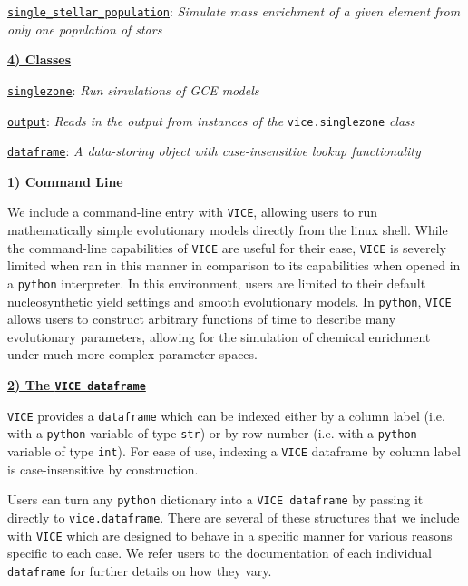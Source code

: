 \documentclass{report}
\begin{document}
\hyperlink{func:single_stellar_population}{\texttt{single\_stellar\_population}}: 
\textit{Simulate mass enrichment of a given element from only one population 
of stars}
\par\noindent
\hyperlink{sec:classes}{\textbf{4) Classes}} 
\par
\hyperlink{obj:singlezone}{\texttt{singlezone}}: 
\textit{Run simulations of GCE models}\par
\hyperlink{obj:output}{\texttt{output}}: 
\textit{Reads in the output from instances of the }\texttt{vice.singlezone}
\textit{ class}
\par
\hyperlink{obg:dataframe}{\texttt{dataframe}}: 
\textit{A data-storing object with case-insensitive lookup functionality}
\par\null\par

\noindent
\hypertarget{sec:cmdline}{\textbf{1) Command Line}} \par\noindent 
We include a command-line entry with \texttt{VICE}, allowing users to run 
mathematically simple evolutionary models directly from the linux shell. While 
the command-line capabilities of \texttt{VICE} are useful for their ease, 
\texttt{VICE} is severely limited when ran in this manner in comparison to its 
capabilities when opened in a \texttt{python} interpreter. In this environment, 
users are limited to their default nucleosynthetic yield settings and smooth 
evolutionary models. In \texttt{python}, \texttt{VICE} allows users to 
construct arbitrary functions of time to describe many evolutionary parameters, 
allowing for the simulation of chemical enrichment under much more complex 
parameter spaces. 
\par\null\par

\newpage
\null\par\noindent 
\begin{center}
\hypertarget{sec:dataframes}{
	\underline{\LARGE
		\textbf{2) The \texttt{VICE dataframe}}
	}
} 
\end{center}
\par\noindent
\texttt{VICE} provides a \texttt{dataframe} which can be indexed either by a 
column label (i.e. with a \texttt{python} variable of type \texttt{str}) or 
by row number (i.e. with a \texttt{python} variable of type \texttt{int}). 
For ease of use, indexing a \texttt{VICE} dataframe by column label is 
case-insensitive by construction. 
\par
Users can turn any \texttt{python} dictionary into a \texttt{VICE dataframe} 
by passing it directly to \texttt{vice.dataframe}. There are several of these 
structures that we include with \texttt{VICE} which are designed to behave 
in a specific manner for various reasons specific to each case. We refer users 
to the documentation of each individual \texttt{dataframe} for further details 
on how they vary. 
\end{document}
